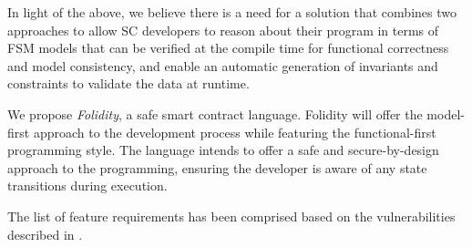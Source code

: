 \documentclass[oneside]{ecsproject}     %
\begin{document}
In light of the above, we believe there is a need for a solution that combines two approaches to allow SC developers to reason
about their program in terms of FSM models that can be verified at the compile time for functional correctness and model consistency,
and enable an automatic generation of invariants and constraints to validate the data at runtime.

We propose \textit{Folidity}, a safe smart contract language. Folidity will offer the model-first approach to the development process
while featuring the functional-first programming style. The language intends to offer a safe and secure-by-design approach to the programming, 
ensuring the developer is aware of any state transitions during execution.

The list of feature requirements has been comprised based on the vulnerabilities described in .
\end{document}
